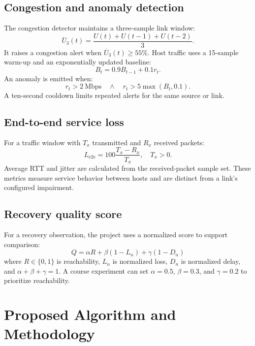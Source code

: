 \documentclass[conference]{IEEEtran}
\begin{document}
\subsection{Congestion and anomaly detection}

The congestion detector maintains a three-sample link window:
\begin{equation}
 \overline{U}_3(t)=\frac{U(t)+U(t-1)+U(t-2)}{3}.
\end{equation}
It raises a congestion alert when $\overline{U}_3(t)\geq55\%$. Host
traffic uses a 15-sample warm-up and an exponentially updated baseline:
\begin{equation}
 B_t=0.9B_{t-1}+0.1r_t.
\end{equation}
An anomaly is emitted when:
\begin{equation}
 r_t>2\ \mathrm{Mbps}
 \quad\land\quad r_t>5\max(B_t,0.1).
\label{eq:anomaly}
\end{equation}
A ten-second cooldown limits repeated alerts for the same source or link.

\subsection{End-to-end service loss}

For a traffic window with $T_x$ transmitted and $R_x$ received packets:
\begin{equation}
 L_{\mathrm{e2e}}=100\frac{T_x-R_x}{T_x},\quad T_x>0.
\label{eq:loss}
\end{equation}
Average RTT and jitter are calculated from the received-packet sample set.
These metrics measure service behavior between hosts and are distinct from a
link's configured impairment.

\subsection{Recovery quality score}

For a recovery observation, the project uses a normalized score to support
comparison:
\begin{equation}
 Q=\alpha R+\beta(1-L_n)+\gamma(1-D_n)
\end{equation}
where $R\in\{0,1\}$ is reachability, $L_n$ is normalized loss,
$D_n$ is normalized delay, and $\alpha+\beta+\gamma=1$. A course experiment
can set $\alpha=0.5$, $\beta=0.3$, and $\gamma=0.2$ to prioritize reachability.

\section{Proposed Algorithm and Methodology}
\label{sec:method}
\end{document}
